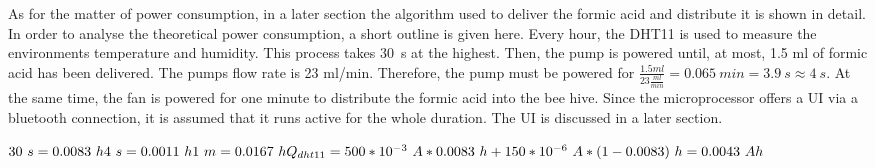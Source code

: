 As for the matter of power consumption, in a later section the algorithm used to deliver the formic acid and distribute it is shown in detail. %
In order to analyse the theoretical power consumption, a short outline is given here.
Every hour, the DHT11 is used to measure the environments temperature and humidity.
This process takes 30\ s at the highest.
Then, the pump is powered until, at most, 1.5 ml of formic acid has been delivered.
The pumps flow rate is 23 ml/min.
Therefore, the pump must be powered for $\frac{1.5 ml}{23 \frac{ml}{min}} = 0.065\ min = 3.9\ s \approx 4\ s$.
At the same time, the fan is powered for one minute to distribute the formic acid into the bee hive.
Since the microprocessor offers a UI via a bluetooth connection, it is assumed that it runs active for the whole duration.
The UI is discussed in a later section. %

\begin{math}
    30\ s = 0.0083\ h \\
    4\ s = 0.0011\ h \\
    1\ m = 0.0167\ h \\
    Q_{dht11} = 500 * 10^{-3}\ A * 0.0083\ h + 150 * 10^{-6}\ A * (1 - 0.0083)\ h = 0.0043\ Ah\\
\end{math}